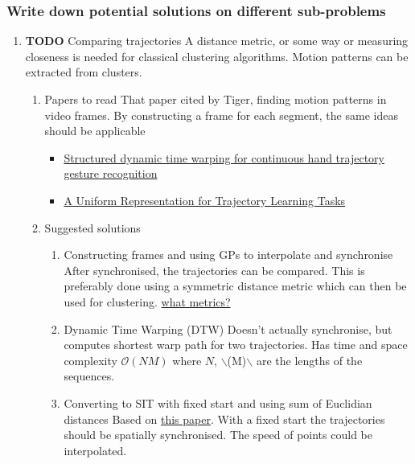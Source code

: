 \documentclass[11pt]{article}
\begin{document}
\subsubsection{Write down potential solutions on different sub-problems}
\label{sec:orgd2a7505}
\label{sub-problems}
\begin{enumerate}
\item {\bfseries\sffamily TODO} Comparing trajectories
\label{sec:orgf941a30}
A distance metric, or some way or
measuring closeness is needed for classical clustering algorithms. Motion
patterns can be extracted from clusters.

\begin{enumerate}
\item Papers to read
\label{sec:orgdf5b87c}
That paper cited by Tiger, finding motion patterns in
video frames. By constructing a frame for each segment, the same
ideas should be applicable \cite{Kim2011Nov}

\begin{itemize}
\item \href{https://www.sciencedirect.com/science/article/abs/pii/S0031320318300621}{Structured dynamic time warping for continuous hand trajectory gesture recognition}
\item \href{https://dl.acm.org/citation.cfm?id=3140017}{A Uniform Representation for Trajectory Learning Tasks}
\end{itemize}

\item Suggested solutions
\label{sec:orgf16e770}
\begin{enumerate}
\item Constructing frames and using GPs to interpolate and synchronise
\label{sec:org7ce7afc}
After synchronised, the trajectories can be compared. This is
preferably done using a symmetric distance metric which can
then be used for clustering. \hyperref[tiger-questions]{what metrics?}

\item Dynamic Time Warping (DTW)
\label{sec:org12330aa}
Doesn't actually synchronise, but computes shortest warp path
for two trajectories. Has time and space complexity \(\mathcal{O}(NM)\)
where \(N\), $\backslash$(M)$\backslash$ are the lengths of the sequences.

\item Converting to SIT with fixed start and using sum of Euclidian distances
\label{sec:orgaad7741}
Based on \href{https://dl.acm.org/citation.cfm?id=3140017}{this paper}. With a fixed start the trajectories should
be spatially synchronised. The speed of points could be
interpolated.
\end{enumerate}
\end{enumerate}


\end{enumerate}
\end{document}
